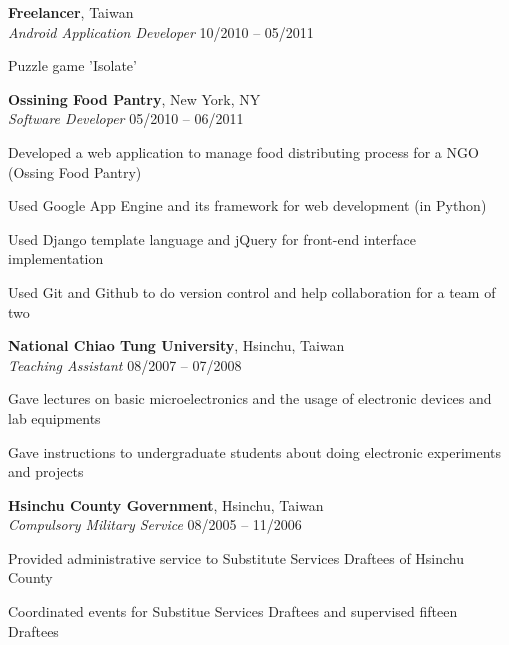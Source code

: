 \documentclass[margin,line]{resume}
\begin{document}
\begin{resume}
    \textbf{Freelancer}, Taiwan \\
    \textsl{Android Application Developer} \hfill 10/2010 -- 05/2011 \vspace{-3mm}\\\vspace{-1mm}%
      \begin{list2}
      \item Puzzle game 'Isolate'
      \end{list2}

    \textbf{Ossining Food Pantry}, New York, NY \\
    \textsl{Software Developer} \hfill 05/2010 -- 06/2011 \vspace{-3mm}\\\vspace{-1mm}%
      \begin{list2}
      \item Developed a web application to manage food distributing process for a NGO (Ossing Food Pantry)
      \item Used Google App Engine and its framework for web development (in Python)
      \item Used Django template language and jQuery for front-end interface implementation
      \item Used Git and Github to do version control and help collaboration for a team of two
      \end{list2}
    
    \textbf{National Chiao Tung University}, Hsinchu, Taiwan \\
    \textsl{Teaching Assistant} \hfill 08/2007 -- 07/2008 \vspace{-3mm}\\\vspace{-1mm}%
      \begin{list2}
      \item Gave lectures on basic microelectronics and the usage of electronic devices and lab equipments
      \item Gave instructions to undergraduate students about doing electronic experiments and projects
      \end{list2}

    \textbf{Hsinchu County Government}, Hsinchu, Taiwan \\
    \textsl{Compulsory Military Service} \hfill 08/2005 -- 11/2006 \vspace{-3mm}\\\vspace{-1mm}%
      \begin{list2}
      \item Provided administrative service to Substitute Services Draftees of Hsinchu County
      \item Coordinated events for Substitue Services Draftees and supervised fifteen Draftees
      \end{list2}


\end{resume}
\end{document}
